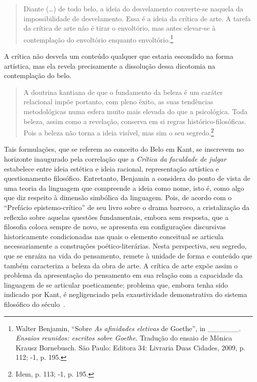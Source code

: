 \begin{quote}
Diante (\ldots{}) de todo belo, a ideia do desvelamento converte-se naquela
da impossibilidade de desvelamento. Essa é a ideia da crítica de arte. A
tarefa da crítica de arte não é tirar o envoltório, mas antes elevar-se
à contemplação do envoltório enquanto envoltório.\footnote{Walter
  Benjamin, ``Sobre \emph{As afinidades eletivas} de Goethe'', in
  \_\_\_\_\_\_. \emph{Ensaios reunidos: escritos sobre Goethe}. Tradução
  do ensaio de Mônica Krausz Bornebusch. São Paulo: Editora 34: Livraria
  Duas Cidades, 2009, p. 112;  -1, p. 195.}
\end{quote}

A crítica não desvela um conteúdo qualquer que estaria escondido na
forma artística, mas ela revela precisamente a dissolução dessa
dicotomia na contemplação do belo.

\begin{quote}
A doutrina kantiana de que o fundamento da beleza é um caráter
relacional impõe portanto, com pleno êxito, as suas tendências
metodológicas numa esfera muito mais elevada do que a psicológica. Toda
beleza, assim como a revelação, conserva em si regras
histórico-filosóficas. Pois a beleza não torna a ideia visível, mas sim
o seu segredo.\footnote{Idem, p. 113;  -1, p. 195.}
\end{quote}

Tais formulações, que se referem ao conceito do Belo em Kant, se
inscrevem no horizonte inaugurado pela correlação que a \emph{Crítica da
faculdade de julgar} estabelece entre ideia estética e ideia racional,
representação artística e questionamento filosófico. Entretanto,
Benjamin a considera do ponto de vista de uma teoria da linguagem que
compreende a ideia como nome, isto é, como algo que diz respeito à
dimensão simbólica da linguagem. Pois, de acordo com o ``Prefácio
epistemo-crítico'' de seu livro sobre o drama barroco, a cristalização
da reflexão sobre aquelas questões fundamentais, embora sem resposta,
que a filosofia coloca sempre de novo, se apresenta em configurações
discursivas historicamente condicionadas nas quais o elemento conceitual
se articula necessariamente a construções poético-literárias. Nesta
perspectiva, seu segredo, que se enraíza na vida do pensamento, remete à
unidade de forma e conteúdo que também caracteriza a beleza da obra de
arte. A crítica de arte expõe assim o problema da apresentação do
pensamento em sua relação com a capacidade da linguagem de se articular
poeticamente; problema que, embora tenha sido indicado por Kant, é
negligenciado pela exaustividade demonstrativa do sistema filosófico do
século~.

